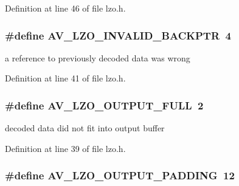 Definition at line 46 of file lzo.\+h.

\subsubsection[{\texorpdfstring{A\+V\+\_\+\+L\+Z\+O\+\_\+\+I\+N\+V\+A\+L\+I\+D\+\_\+\+B\+A\+C\+K\+P\+TR}{AV_LZO_INVALID_BACKPTR}}]{\setlength{\rightskip}{0pt plus 5cm}\#define A\+V\+\_\+\+L\+Z\+O\+\_\+\+I\+N\+V\+A\+L\+I\+D\+\_\+\+B\+A\+C\+K\+P\+TR~4}\hypertarget{group__lavu__lzo_ga6acd84bec8181fecb2861f8c7eb57cc1}{}\label{group__lavu__lzo_ga6acd84bec8181fecb2861f8c7eb57cc1}


a reference to previously decoded data was wrong 



Definition at line 41 of file lzo.\+h.

\subsubsection[{\texorpdfstring{A\+V\+\_\+\+L\+Z\+O\+\_\+\+O\+U\+T\+P\+U\+T\+\_\+\+F\+U\+LL}{AV_LZO_OUTPUT_FULL}}]{\setlength{\rightskip}{0pt plus 5cm}\#define A\+V\+\_\+\+L\+Z\+O\+\_\+\+O\+U\+T\+P\+U\+T\+\_\+\+F\+U\+LL~2}\hypertarget{group__lavu__lzo_ga400c6aec6aeca19117fb9ff6f6d30325}{}\label{group__lavu__lzo_ga400c6aec6aeca19117fb9ff6f6d30325}


decoded data did not fit into output buffer 



Definition at line 39 of file lzo.\+h.

\subsubsection[{\texorpdfstring{A\+V\+\_\+\+L\+Z\+O\+\_\+\+O\+U\+T\+P\+U\+T\+\_\+\+P\+A\+D\+D\+I\+NG}{AV_LZO_OUTPUT_PADDING}}]{\setlength{\rightskip}{0pt plus 5cm}\#define A\+V\+\_\+\+L\+Z\+O\+\_\+\+O\+U\+T\+P\+U\+T\+\_\+\+P\+A\+D\+D\+I\+NG~12}\hypertarget{group__lavu__lzo_gaece7adef189377f4ab7da464247a9e85}{}\label{group__lavu__lzo_gaece7adef189377f4ab7da464247a9e85}



